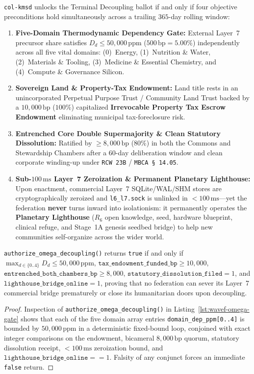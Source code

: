\texttt{col-kmsd} unlocks the Terminal Decoupling ballot if and only if four objective preconditions
hold simultaneously across a trailing $365$-day rolling window:
\begin{enumerate}
    \item \textbf{Five-Domain Thermodynamic Dependency Gate:} External Layer~7 precursor share
    satisfies $D_d \le 50{,}000\,\mathrm{ppm}$ ($500\,\mathrm{bp} = 5.00\%$) independently across
    all five vital domains: (0)~Energy, (1)~Nutrition \& Water, (2)~Materials \& Tooling,
    (3)~Medicine \& Essential Chemistry, and (4)~Compute \& Governance Silicon.
    \item \textbf{Sovereign Land \& Property-Tax Endowment:} Land title rests in an unincorporated
    Perpetual Purpose Trust / Community Land Trust backed by a $10{,}000\,\mathrm{bp}$ ($100\%$)
    capitalized \textbf{Irrevocable Property Tax Escrow Endowment} eliminating municipal tax-foreclosure risk.
    \item \textbf{Entrenched Core Double Supermajority \& Clean Statutory Dissolution:} Ratified by
    $\ge 8{,}000\,\mathrm{bp}$ ($80\%$) in both the Commons and Stewardship Chambers after a $60$-day
    deliberation window and clean corporate winding-up under \texttt{RCW 23B} / \texttt{MBCA \S\,14.05}.
    \item \textbf{Sub-$100\,\mathrm{ms}$ Layer~7 Zeroization \& Permanent Planetary Lighthouse:}
    Upon enactment, commercial Layer~7 SQLite/WAL/SHM stores are cryptographically zeroized and
    \texttt{l6\_l7.sock} is unlinked in $< 100\,\mathrm{ms}$---yet the federation \textbf{never}
    turns inward into isolationism: it permanently operates the \textbf{Planetary Lighthouse} ($R_6$ open
    knowledge, seed, hardware blueprint, clinical refuge, and Stage~1A genesis seedbed bridge) to
    help new communities self-organize across the wider world.
\end{enumerate}

\begin{theorem}
\label{thm:wavef-omega-lighthouse}
\texttt{authorize\_omega\_decoupling()} returns \texttt{true} if and only if $\max_{d \in \{0..4\}} D_d \le 50{,}000\,\mathrm{ppm}$,
$\mathtt{tax\_endowment\_funded\_bp} \ge 10{,}000$, $\mathtt{entrenched\_both\_chambers\_bp} \ge 8{,}000$,
$\mathtt{statutory\_dissolution\_filed} = 1$, and $\mathtt{lighthouse\_bridge\_online} = 1$, proving
that no federation can sever its Layer~7 commercial bridge prematurely or close its humanitarian
doors upon decoupling.
\end{theorem}
\begin{proof}
Inspection of \texttt{authorize\_omega\_decoupling()} in Listing~\ref{lst:wavef-omega-gate} shows
that each of the five domain array entries \texttt{domain\_dep\_ppm[0..4]} is bounded by $50{,}000\,\mathrm{ppm}$
in a deterministic fixed-bound loop, conjoined with exact integer comparisons on the endowment,
bicameral $8{,}000\,\mathrm{bp}$ quorum, statutory dissolution receipt, $< 100\,\mathrm{ms}$
zeroization bound, and $\mathtt{lighthouse\_bridge\_online} == 1$. Falsity of any conjunct forces an
immediate \texttt{false} return.
\end{proof}

